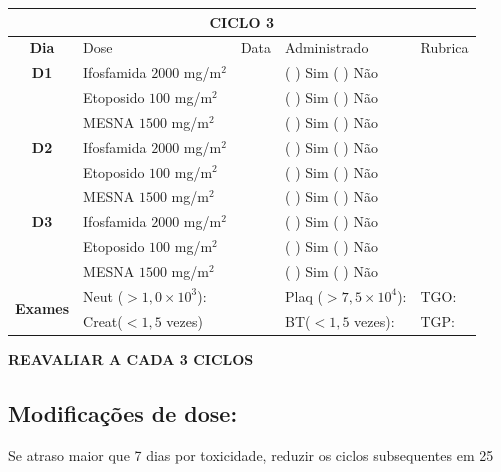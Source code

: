 \documentclass[11pt,a4paper,oldfontcommands]{memoir}
\begin{document}
\begin{center}
\begin{longtable}{p{1cm}p{4cm}|p{1cm}|p{3cm}|p{3cm}}
	\hline
	\multicolumn{5}{c}{\textbf{CICLO 3}}\\
\hline
    \multicolumn{1}{c|}{\multirow{1}{*}{\textbf{Dia}}}&{Dose}&{Data}&{Administrado}&{Rubrica} \\
    \hline
    \multicolumn{1}{c|}{\multirow{1}{*}{\textbf{D1}}}&{Ifosfamida \(2000\) mg/m\(^2\)}&&{(  ) Sim (  ) Não}&\\
    \multicolumn{1}{c|}{\multirow{1}{*}{\textbf{}}}&{Etoposido \(100\) mg/m\(^2\)}&&{(  ) Sim (  ) Não}&\\
    \multicolumn{1}{c|}{\multirow{1}{*}{\textbf{}}}&{MESNA \(1500\) mg/m\(^2\)}&&{(  ) Sim (  ) Não}&\\
    \multicolumn{1}{c|}{\multirow{1}{*}{\textbf{D2}}}&{Ifosfamida \(2000\) mg/m\(^2\)}&&{(  ) Sim (  ) Não}&\\
    \multicolumn{1}{c|}{\multirow{1}{*}{\textbf{}}}&{Etoposido \(100\) mg/m\(^2\)}&&{(  ) Sim (  ) Não}&\\
    \multicolumn{1}{c|}{\multirow{1}{*}{\textbf{}}}&{MESNA \(1500\) mg/m\(^2\)}&&{(  ) Sim (  ) Não}&\\
    \multicolumn{1}{c|}{\multirow{1}{*}{\textbf{D3}}}&{Ifosfamida \(2000\) mg/m\(^2\)}&&{(  ) Sim (  ) Não}&\\
    \multicolumn{1}{c|}{\multirow{1}{*}{\textbf{}}}&{Etoposido \(100\) mg/m\(^2\)}&&{(  ) Sim (  ) Não}&\\
    \multicolumn{1}{c|}{\multirow{1}{*}{\textbf{}}}&{MESNA \(1500\) mg/m\(^2\)}&&{(  ) Sim (  ) Não}&\\

    \hline
    \multicolumn{1}{c|}{\multirow{2}{*}{\textbf{Exames}}}&\multicolumn{2}{l|}{Neut (\(>1,0\times10^3\)):}&{Plaq (\(>7,5\times10^4\)):}&{TGO:}\\
    \cline{2-5}
    \multicolumn{1}{c|}{\multirow{2}{*}{{}}}&\multicolumn{2}{l|}{Creat(\(<1,5\) vezes)}&{BT(\(<1,5\) vezes):}&{TGP:}
    \\
    \hline
\end{longtable}

\textbf{REAVALIAR A CADA 3 CICLOS}
\end{center}

\subsection{Modificações de dose:}
Se atraso maior que 7 dias por toxicidade, reduzir os ciclos subsequentes em 25%
\end{document}
